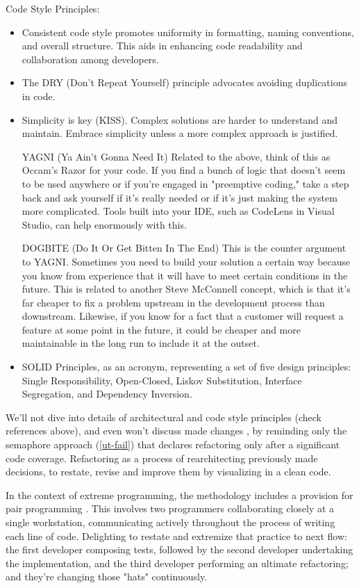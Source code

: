\noindent Code Style Principles:

\begin{itemize}
  \item Consistent code style \cite{Mart22} promotes uniformity in formatting, naming conventions, and overall structure. 
  This aids in enhancing code readability and collaboration among developers.

  \item The DRY (Don't Repeat Yourself) principle advocates avoiding duplications in code.

  \item Simplicity is key (KISS). Complex solutions are harder to understand and maintain. Embrace simplicity unless a 
  more complex approach is justified.

  YAGNI (Ya Ain't Gonna Need It)
  Related to the above, think of this as Occam's Razor for your code. If you find a bunch of logic that doesn't seem to be used anywhere or if you're engaged in "preemptive coding," take a step back and ask yourself if it's really needed or if it's just making the system more complicated. Tools built into your IDE, such as CodeLens in Visual Studio, can help enormously with this.


  DOGBITE (Do It Or Get Bitten In The End)
  This is the counter argument to YAGNI. Sometimes you need to build your solution a certain way because you know from experience that it will have to meet certain conditions in the future. This is related to another Steve McConnell concept, which is that it's far cheaper to fix a problem upstream in the development process than downstream. Likewise, if you know for a fact that a customer will request a feature at some point in the future, it could be cheaper and more maintainable in the long run to include it at the outset.


  \item SOLID Principles, as an acronym, representing a set of five design principles: Single Responsibility, 
  Open-Closed, Liskov Substitution, Interface Segregation, and Dependency Inversion.
\end{itemize}

\noindent We'll not dive into details of architectural and code style principles (check references above), and even 
won't discuss made changes , by reminding only the semaphore approach (\ref{ut-fail}) that declares 
refactoring only after a significant code coverage. Refactoring as a process of rearchitecting \cite{Chec23} previously
made decisions, to restate, revise and improve them by visualizing in a clean code. 

In the context of extreme programming, the methodology includes a provision for pair programming \cite{Ligu19}. This 
involves two programmers collaborating closely at a single workstation, communicating actively throughout the process 
of writing each line of code. Delighting to restate and extremize that practice to next flow: the first developer 
composing tests, followed by the second developer undertaking the implementation, and the third developer 
performing an ultimate refactoring; and they're changing those "hats" \cite{Bono17} continuously.
